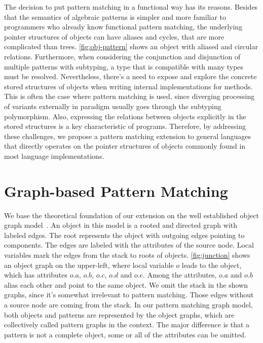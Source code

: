 The decision to put {\OO} pattern matching in a functional way has its reasons.
Besides that the semantics of algebraic patterns is simpler and more familiar to programmers who already know functional pattern matching,
the underlying pointer structures of objects can have aliases and cycles, that are more complicated than trees.
\autoref{fig:obj-pattern} shows an object with aliased and circular relations.
Furthermore, when considering the conjunction and disjunction of multiple patterns with subtyping,
a type that is compatible with many types must be resolved.
Nevertheless, there's a need to expose and explore the concrete stored structures of objects when writing internal implementations for {\OO} methods.
This is often the case where pattern matching is used, since diverging processing of variants externally in {\OO} paradigm usually goes through the subtyping polymorphism.
Also, expressing the relations between objects explicitly in the stored structures is a key characteristic of {\OO} programs.
Therefore, by addressing these challenges, we propose a pattern matching extension to general {\OO} languages
that directly operates on the pointer structures of objects commonly found in most language implementations.

\section{Graph-based Pattern Matching}

We base the theoretical foundation of our extension on the well established object graph model~\cite{ke2009graph}.
An object in this model is a rooted and directed graph with labeled edges.
The root represents the object with outgoing edges pointing to components.
The edges are labeled with the attributes of the source node.
Local variables mark the edges from the stack to roots of objects.
\autoref{fig:junction} shows an object graph on the upper-left, where local variable $o$ leads to the object, which has attributes $o.a$, $o.b$, $o.c$, $o.d$ and $o.e$.
Among the attributes, $o.a$ and $o.b$ alias each other and point to the same object.
We omit the stack in the shown graphs, since it's somewhat irrelevant to pattern matching. Those edges without a source node are coming from the stack.
In our pattern matching graph model, both objects and patterns are represented by the object graphs, which are collectively called pattern graphs in the context.
The major difference is that a pattern is not a complete object, some or all of the attributes can be omitted.


